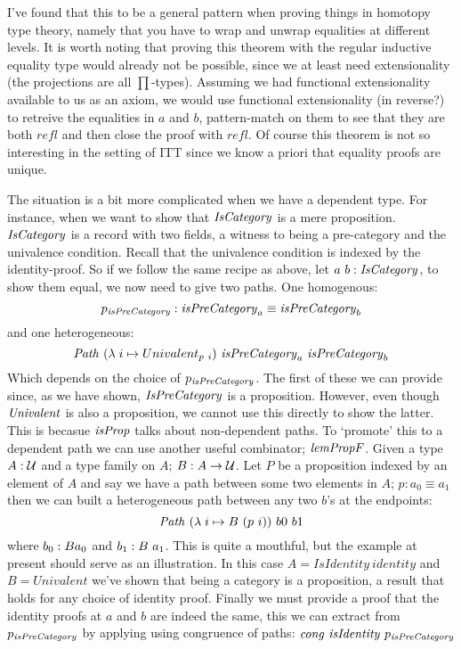 %
I've found that this to be a general pattern when proving things in homotopy
type theory, namely that you have to wrap and unwrap equalities at different
levels. It is worth noting that proving this theorem with the regular inductive
equality type would already not be possible, since we at least need
extensionality (the projections are all $\prod$-types). Assuming we had
functional extensionality available to us as an axiom, we would use functional
extensionality (in reverse?) to retreive the equalities in $a$ and $b$,
pattern-match on them to see that they are both $\mathit{refl}$ and then close
the proof with $\mathit{refl}$. Of course this theorem is not so interesting in
the setting of ITT since we know a priori that equality proofs are unique.

The situation is a bit more complicated when we have a dependent type. For
instance, when we want to show that $\mathit{IsCategory}$ is a mere proposition.
$\mathit{IsCategory}$ is a record with two fields, a witness to being a pre-category and
the univalence condition. Recall that the univalence condition is indexed by the
identity-proof. So if we follow the same recipe as above, let $a\ b \;\mathord{:}\;
\mathit{IsCategory}$, to show them equal, we now need to give two paths. One homogenous:
%
$$
p_{\mathit{isPreCategory}} \;\mathord{:}\; \mathit{isPreCategory}_a \equiv \mathit{isPreCategory}_b
$$
%
and one heterogeneous:
%
$$
\Path\ (\lambda\; i \mto Univalent_{p\ i})\ \isPreCategory_a\ \isPreCategory_b
$$
%
Which depends on the choice of $p_{\mathit{isPreCategory}}$. The first of these we can
provide since, as we have shown, $\mathit{IsPreCategory}$ is a proposition. However,
even though $\mathit{Univalent}$ is also a proposition, we cannot use this directly to
show the latter. This is becasue $\mathit{isProp}$ talks about non-dependent paths. To
`promote' this to a dependent path we can use another useful combinator;
$\mathit{lemPropF}$. Given a type $A \;\mathord{:}\; \mathcal{U}$ and a type family on $A$; $B : A \to
\mathcal{U}$. Let $P$ be a proposition indexed by an element of $A$ and say we have a
path between some two elements in $A$; $p : a_0 \equiv a_1$ then we can built a
heterogeneous path between any two $b$'s at the endpoints:
%
$$
\mathit{Path}\ (\lambda\; i \mapsto B\ (p\ i))\ b0\ b1
$$
%
where $b_0 \;\mathord{:}\; B a_0$ and $b_1 \;\mathord{:}\; B\ a_1$. This is quite a mouthful, but the
example at present should serve as an illustration. In this case $A =
\mathit{IsIdentity}\ \mathit{identity}$ and $B = \mathit{Univalent}$ we've shown
that being a category is a proposition, a result that holds for any choice of
identity proof. Finally we must provide a proof that the identity proofs at $a$
and $b$ are indeed the same, this we can extract from $p_{\mathit{isPreCategory}}$ by
applying using congruence of paths: $\congruence\ \mathit{isIdentity}\
p_{\isPreCategory}$


